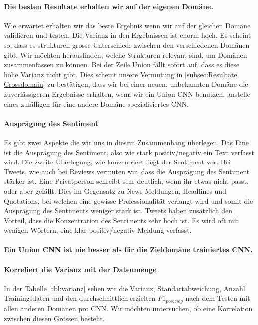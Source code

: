 \paragraph{Die besten Resultate erhalten wir auf der eigenen Domäne.} Wie erwartet erhalten wir das beste Ergebnis wenn wir auf der gleichen Domäne validieren und testen. Die Varianz in den Ergebnissen ist enorm hoch. Es scheint so, dass es strukturell grosse Unterschiede zwischen den verschiedenen Domänen gibt. Wir möchten herausfinden, welche Strukturen relevant sind, um Domänen zusammenfassen zu können.
Bei der Zeile Union fällt sofort auf, dass es diese hohe Varianz nicht gibt. Dies scheint unsere Vermutung in \ref{subsec:Resultate Crossdomain} zu bestätigen, dass wir bei einer neuen, unbekannten Domäne die zuverlässigeren Ergebnisse erhalten, wenn wir ein Union CNN benutzen, anstelle eines zufälligen für eine andere Domäne spezialisiertes CNN.
\paragraph{Ausprägung des Sentiment} Es gibt zwei Aspekte die wir uns in diesem Zusammenhang überlegen. Das Eine ist die Ausprägung des Sentiment, also wie stark positiv/negativ ein Text verfasst wird. Die zweite Überlegung, wie konzentriert liegt der Sentiment vor. Bei Tweets, wie auch bei Reviews vermuten wir, dass die Ausprägung des Sentiment stärker ist. Eine Privatperson schreibt sehr deutlich, wenn ihr etwas nicht passt, oder aber gefällt. Dies im Gegensatz zu News Meldungen, Headlines und Quotations, bei welchen eine gewisse Professionalität verlangt wird und somit die Ausprägung des Sentiments weniger stark ist.
Tweets haben zusätzlich den Vorteil, dass die Konzentration des Sentiments sehr hoch ist. Es wird oft mit wenigen Wörtern, eine klar positiv/negativ Meldung verfasst.
\paragraph{Ein Union CNN ist nie besser als für die Zieldomäne trainiertes CNN.}
\paragraph{Korreliert die Varianz mit der Datenmenge} In der Tabelle \ref{tbl:varianz} sehen wir die Varianz, Standartabweichung, Anzahl Trainingsdaten und den durchschnittlich erzielten $F1_{pos,neg}$ nach dem Testen mit allen anderen Domänen pro CNN. Wir möchten untersuchen, ob eine Korrelation zwischen diesen Grössen besteht.

